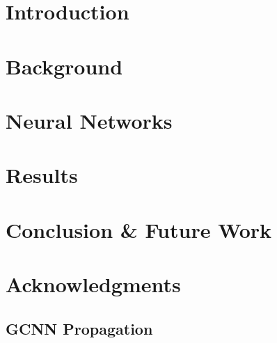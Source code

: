 


	
	\linenumbers
	\newpage
	\section{Introduction}\label{sec:Intro}
	

	\section{Background}\label{sec:BG}
	

	\section{Neural Networks}\label{sec:NN}
	


	\newpage %
	\section{Results}\label{sec:Results}
	

	\section{Conclusion \& Future Work}\label{sec:Conc}
	

	\section{Acknowledgments}\label{sec:Acknow}
	

	\newpage
	\begin{appendices}
	\section{GCNN Propagation}\label{app:GCNN-Prop}
	
	\end{appendices}

	\newpage
	
	

